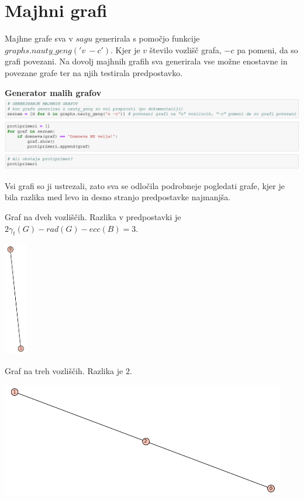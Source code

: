 \documentclass[10pt, a4paper]{article}
\begin{document}
\pagebreak

\section{Majhni grafi}

Majhne grafe sva v $sagu$ generirala s pomočjo funkcije $graphs.nauty\_geng('v\ -c')$. Kjer je $v$ število vozlišč grafa, $-c$ pa pomeni, da so grafi povezani. Na dovolj majhnih grafih sva generirala vse možne enostavne in povezane grafe ter na njih testirala predpostavko.

\begin{center}
\textbf{Generator malih grafov}
\includegraphics[width=16cm]{mali_grafi}
\end{center}

Vsi grafi so ji ustrezali, zato sva se odločila podrobneje pogledati grafe, kjer je bila razlika med levo in desno stranjo predpostavke najmanjša.

Graf na dveh vozliščih. Razlika v predpostavki je  $2\gamma_{t}(G) - rad(G) - ecc(B) = 3$.

\begin{center}
\includegraphics[height=5cm]{min_graf_2}
\end{center}

Graf na treh vozliščih. Razlika je $2$.

\begin{center}
\includegraphics[height=5cm]{min_graf_3}
\end{center}
\end{document}
